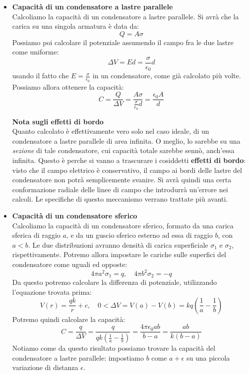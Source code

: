 \documentclass[a4paper,12pt]{article}
\begin{document}
\begin{itemize}
  \item \textbf{Capacità di un condensatore a lastre parallele} \\
    Calcoliamo la capacità di un condensatore a lastre parallele. Si avrà che la carica su una singola armatura è data da:
    $$ Q = A\sigma$$
    Possiamo poi calcolare il potenziale assumendo il campo fra le due lastre come uniforme:
    $$ \Delta V = Ed = \frac{\sigma}{\epsilon_0}d $$
    usando il fatto che $E = \frac{\sigma}{\epsilon_0}$ in un condensatore, come già calcolato più volte.
    Possiamo allora ottenere la capacità:
    $$ C = \frac{Q}{\Delta V} = \frac{A\sigma}{\frac{\sigma}{\epsilon_0}d} = \frac{\epsilon_0A}{d} $$
    \par\smallskip
    \textbf{Nota sugli effetti di bordo} \\
    Quanto calcolato è effettivamente vero solo nel caso ideale, di un condensatore a lastre parallele di area infinita. O meglio, lo sarebbe su una \textit{sezione} di tale condensatore, cui capacità totale sarebbe sennò, anch'essa infinita.
    Questo è perche si vanno a trascurare i cosiddetti \textbf{effetti di bordo}: visto che il campo elettrico è conservativo, il campo ai bordi delle lastre del condensatore non potrà semplicemente svanire. Si avrà quindi una certa conformazione radiale
    delle linee di campo che introdurrà un'errore nei calcoli. Le specifiche di questo meccanismo verrano trattate più avanti.
  \item \textbf{Capacità di un condensatore sferico} \\
    Calcoliamo la capacità di un condensatore sferico, formato da una carica sferica di raggio $a$, e da un guscio sferico esterno ad essa di raggio $b$, con $a < b$. Le due distribuzioni avranno densità di carica superficiale $\sigma_1$ e $\sigma_2$, rispettivamente.
    Potremo allora impostare le cariche sulle superfici del condensatore come uguali ed opposte:
    $$ 4\pi a^2 \sigma_1 = q, \quad 4\pi b^2 \sigma_2 = -q$$
    Da questo potremo calcolare la differenza di potenziale, utilizzando l'equazione trovata prima:
    $$ V(r) = \frac{qk}{r} + c, \quad 0 < \Delta V = V(a) - V(b) = kq\left(\frac{1}{a} - \frac{1}{b}\right) $$
    Potremo quindi calcolare la capacità:
    $$ C = \frac{q}{\Delta V} = \frac{q}{qk\left(\frac{1}{a} - \frac{1}{b}\right)} = \frac{4\pi \epsilon_0 ab }{b - a} = \frac{ab}{k(b-a)} $$
    Notiamo come da questo risultato possiamo trovare la capacità del condensatore a lastre parallele: impostiamo $b$ come $a + \epsilon$ su una piccola variazione di distanza $\epsilon$.

\end{itemize}
\end{document}
